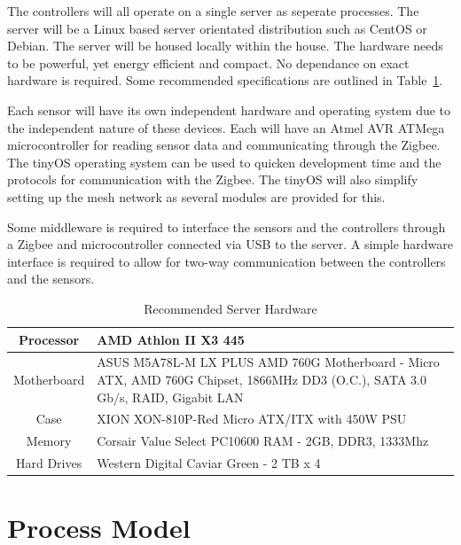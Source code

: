\documentclass{report}
\begin{document}
The controllers will all operate on a single server as seperate processes. The
server will be a Linux based server orientated distribution such as CentOS or
Debian. The server will be housed locally within the house. The hardware needs
to be powerful, yet energy efficient and compact. No dependance on exact
hardware is required. Some recommended specifications are outlined in
Table~\ref{server_hardware}.

Each sensor will have its own independent hardware and operating system due to
the independent nature of these devices. Each will have an Atmel AVR ATMega
microcontroller for reading sensor data and communicating through the Zigbee.
The tinyOS operating system can be used to quicken development time and the
protocols for communication with the Zigbee. The tinyOS will also simplify
setting up the mesh network as several modules are provided for this.

Some middleware is required to interface the sensors and the controllers
through a Zigbee and microcontroller connected via USB to the server. A simple
hardware interface is required to allow for two-way communication between the
controllers and the sensors.

\begin{table}[h]
    \caption{Recommended Server Hardware}
    \label{server_hardware}
    \centering
    \begin{tabular}{| c | p{5cm} |}
    \hline
    Processor & AMD Athlon II X3 445 \\ \hline
    Motherboard & ASUS M5A78L-M LX PLUS AMD 760G Motherboard - Micro ATX,
    AMD 760G Chipset, 1866MHz DD3 (O.C.), SATA 3.0 Gb/s, RAID, Gigabit LAN \\
    \hline
    Case &  XION XON-810P-Red Micro ATX/ITX with 450W PSU \\ \hline
    Memory & Corsair Value Select PC10600 RAM - 2GB, DDR3, 1333Mhz \\ \hline
    Hard Drives & Western Digital Caviar Green - 2 TB x 4 \\
    \hline
    \end{tabular}
\end{table}


\section{Process Model}
\end{document}
